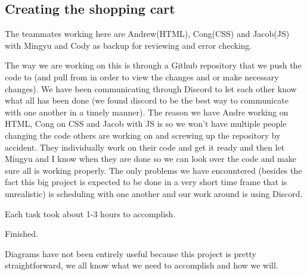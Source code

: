 \documentclass[12pt]{article}
\begin{document}
		\subsection{Creating the shopping cart}
		\begin{iterate}

		\item The teammates working here are Andrew(HTML), Cong(CSS) and Jacob(JS) with Mingyu and Cody as backup for reviewing and error checking.

		\item The way we are working on this is through a Github repository that we push the code to (and pull from in order to view the changes and or make necessary changes).  We have been communicating through Discord to let each other know what all has been done (we found discord to be the best way to communicate with one another in a timely manner).  The reason we have Andre working on HTML, Cong on CSS and Jacob with JS is so we won’t have multiple people changing the code others are working on and screwing up the repository by accident.  They individually work on their code and get it ready and then let Mingyu and I know when they are done so we can look over the code and make sure all is working properly.  The only problems we have encountered (besides the fact this big project is expected to be done in a very short time frame that is unrealistic) is scheduling with one another and our work around is using Discord.

		\item Each task took about 1-3 hours to accomplish.

		\item Finished.

		\item Diagrams have not been entirely useful because this project is pretty straightforward, we all know what we need to accomplish and how we will.
		\end{iterate}
\end{document}

